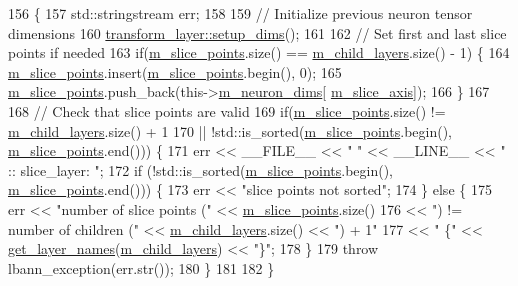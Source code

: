 \begin{DoxyCode}
156                              \{
157     std::stringstream err;
158 
159     \textcolor{comment}{// Initialize previous neuron tensor dimensions}
160     \hyperlink{classlbann_1_1Layer_a90fce1b06c1f2abb480e18cfe08a9746}{transform\_layer::setup\_dims}();
161 
162     \textcolor{comment}{// Set first and last slice points if needed}
163     \textcolor{keywordflow}{if}(\hyperlink{classlbann_1_1slice__layer_af79dab13a70da2e81209e7ae15166e30}{m\_slice\_points}.size() == \hyperlink{classlbann_1_1Layer_ae348c0d2b4d05f74d809d09debb633c0}{m\_child\_layers}.size() - 1) \{
164       \hyperlink{classlbann_1_1slice__layer_af79dab13a70da2e81209e7ae15166e30}{m\_slice\_points}.insert(\hyperlink{classlbann_1_1slice__layer_af79dab13a70da2e81209e7ae15166e30}{m\_slice\_points}.begin(), 0);
165       \hyperlink{classlbann_1_1slice__layer_af79dab13a70da2e81209e7ae15166e30}{m\_slice\_points}.push\_back(this->\hyperlink{classlbann_1_1Layer_abb34bb8031f57a483e2e327a5f229f48}{m\_neuron\_dims}[
      \hyperlink{classlbann_1_1slice__layer_a349dcd71f67d77d40247da24e4641ea2}{m\_slice\_axis}]);
166     \}
167 
168     \textcolor{comment}{// Check that slice points are valid}
169     \textcolor{keywordflow}{if}(\hyperlink{classlbann_1_1slice__layer_af79dab13a70da2e81209e7ae15166e30}{m\_slice\_points}.size() != \hyperlink{classlbann_1_1Layer_ae348c0d2b4d05f74d809d09debb633c0}{m\_child\_layers}.size() + 1
170        || !std::is\_sorted(\hyperlink{classlbann_1_1slice__layer_af79dab13a70da2e81209e7ae15166e30}{m\_slice\_points}.begin(), \hyperlink{classlbann_1_1slice__layer_af79dab13a70da2e81209e7ae15166e30}{m\_slice\_points}.end())) \{
171       err << \_\_FILE\_\_ << \textcolor{stringliteral}{" "} << \_\_LINE\_\_ << \textcolor{stringliteral}{" :: slice\_layer: "};
172       \textcolor{keywordflow}{if} (!std::is\_sorted(\hyperlink{classlbann_1_1slice__layer_af79dab13a70da2e81209e7ae15166e30}{m\_slice\_points}.begin(), \hyperlink{classlbann_1_1slice__layer_af79dab13a70da2e81209e7ae15166e30}{m\_slice\_points}.end())) \{
173         err << \textcolor{stringliteral}{"slice points not sorted"};
174       \} \textcolor{keywordflow}{else} \{
175         err << \textcolor{stringliteral}{"number of slice points ("} << \hyperlink{classlbann_1_1slice__layer_af79dab13a70da2e81209e7ae15166e30}{m\_slice\_points}.size()
176             << \textcolor{stringliteral}{") != number of children ("} << \hyperlink{classlbann_1_1Layer_ae348c0d2b4d05f74d809d09debb633c0}{m\_child\_layers}.size() << \textcolor{stringliteral}{") + 1"}
177             << \textcolor{stringliteral}{" \{"} << \hyperlink{classlbann_1_1Layer_af4a093d91552cf079217eb346bbb847f}{get\_layer\_names}(\hyperlink{classlbann_1_1Layer_ae348c0d2b4d05f74d809d09debb633c0}{m\_child\_layers}) << \textcolor{stringliteral}{"\}"};
178       \}
179       \textcolor{keywordflow}{throw} lbann\_exception(err.str());
180     \}
181 
182   \}
\end{DoxyCode}
